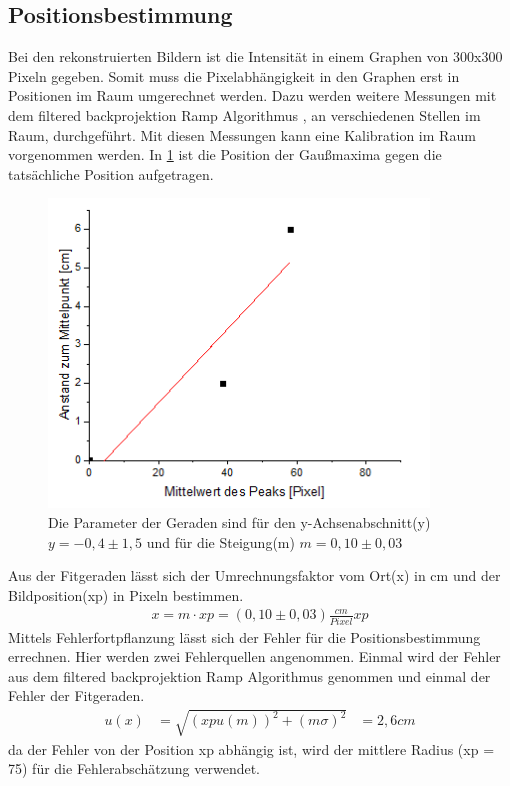 \subsection{Positionsbestimmung}
Bei den rekonstruierten Bildern ist die Intensität in einem Graphen von 300x300 Pixeln gegeben. Somit muss die Pixelabhängigkeit in den Graphen erst in Positionen im Raum umgerechnet werden. Dazu werden weitere Messungen mit dem filtered backprojektion Ramp Algorithmus , an  verschiedenen Stellen im Raum, durchgeführt. Mit diesen Messungen kann eine Kalibration im Raum vorgenommen werden. In \cref{oop} ist die Position der Gaußmaxima gegen die tatsächliche Position aufgetragen.
\begin{figure}[h!]
	\centering
	\includegraphics[width=0.9\textwidth]{Position.png}
	\caption{Die Parameter der Geraden sind für den y-Achsenabschnitt(y) $y = -0,4 \pm 1,5$ und für die Steigung(m) $m = 0,10 \pm 0,03 $}
	\label{oop}
\end{figure}
Aus der Fitgeraden lässt sich der Umrechnungsfaktor vom Ort(x) in cm und der Bildposition(xp) in Pixeln bestimmen.
\begin{align}
	x = m \cdot xp =  (0,10 \pm 0,03)\frac{cm}{Pixel} xp
\end{align}
Mittels Fehlerfortpflanzung lässt sich der Fehler für die Positionsbestimmung errechnen.
Hier werden zwei Fehlerquellen angenommen. Einmal wird der Fehler aus dem filtered backprojektion Ramp Algorithmus genommen und einmal der Fehler der Fitgeraden.
\begin{align}
	u(x) &= \sqrt{(xpu(m))^2 + (m\sigma)^2} &= 2,6cm
\end{align}
da der Fehler von der Position xp abhängig ist, wird der mittlere Radius (xp = 75) für die Fehlerabschätzung verwendet.

